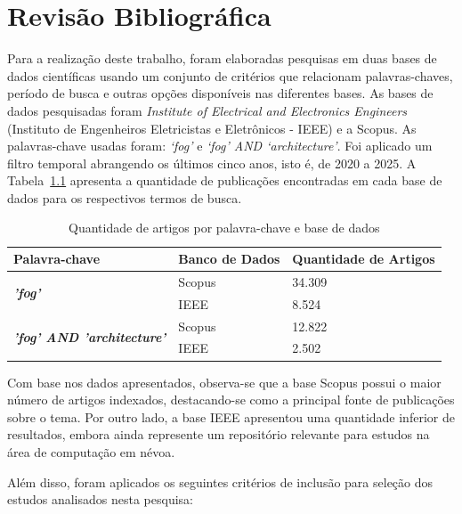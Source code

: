 \chapter{Revisão Bibliográfica}\label{cap:revisao_bibliografica}

Para a realização deste trabalho, foram elaboradas pesquisas em duas bases de dados científicas usando um conjunto de critérios que relacionam palavras-chaves, período de busca e outras opções disponíveis nas diferentes bases. As bases de dados pesquisadas foram \textit{Institute of Electrical and Electronics Engineers} (Instituto de Engenheiros Eletricistas e Eletrônicos - IEEE) e a Scopus. As palavras-chave usadas foram: \textit{‘fog’} e \textit{‘fog’ AND ‘architecture’}. Foi aplicado um filtro temporal abrangendo os últimos cinco anos, isto é, de 2020 a 2025. A Tabela~\ref{tab:Tab_ArtigosFog} apresenta a quantidade de publicações encontradas em cada base de dados para os respectivos termos de busca.

\begin{table}[htb]
	\ABNTEXfontereduzida
	\caption{\label{tab:Tab_ArtigosFog}Quantidade de artigos por palavra-chave e base de dados}
	\begin{tabular}{@{}p{6.5cm}p{3.5cm}p{4cm}@{}}
		\toprule
		\textbf{Palavra-chave} & \textbf{Banco de Dados} & \textbf{Quantidade de Artigos} \\ \midrule
		\multirow[c]{2}{*}{\textbf{\textit{'fog'}}} 
		    & Scopus & 34.309 \\ 
		    & IEEE   & 8.524  \\ \midrule
		\multirow[c]{2}{*}{\textbf{\textit{'fog' AND 'architecture'}}} 
		    & Scopus & 12.822 \\ 
		    & IEEE   & 2.502 \\ \midrule
	\end{tabular}
\end{table}

Com base nos dados apresentados, observa-se que a base Scopus possui o maior número de artigos indexados, destacando-se como a principal fonte de publicações sobre o tema.
Por outro lado, a base IEEE apresentou uma quantidade inferior de resultados, embora ainda represente um repositório relevante para estudos na área de computação em névoa.

Além disso, foram aplicados os seguintes critérios de inclusão para seleção dos estudos analisados nesta pesquisa:

